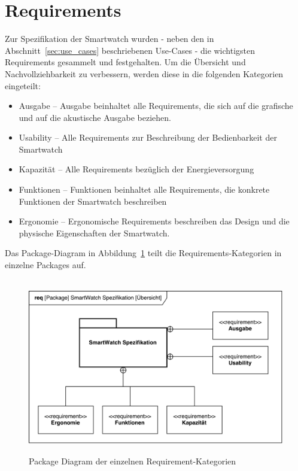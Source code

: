 \section{Requirements}
\label{sec:requirements}
Zur \gls{Spezifikation} der Smartwatch wurden - neben den in Abschnitt~\ref{sec:use_cases} beschriebenen \glspl{Use-Case} - die wichtigsten \glspl{Requirement} gesammelt und festgehalten. Um die Übersicht und Nachvollziehbarkeit zu verbessern, werden diese in die folgenden Kategorien eingeteilt:

\begin{itemize}
	\item Ausgabe -- Ausgabe beinhaltet alle Requirements, die sich auf die grafische und auf die akustische Ausgabe beziehen.
	\item \gls{Usability} -- Alle Requirements zur Beschreibung der Bedienbarkeit der Smartwatch
	\item Kapazität -- Alle Requirements bezüglich der Energieversorgung
	\item Funktionen -- Funktionen beinhaltet alle \glspl{Requirement}, die konkrete Funktionen der Smartwatch beschreiben
	\item \gls{Ergonomie} -- Ergonomische \glspl{Requirement} beschreiben das Design und die physische Eigenschaften der Smartwatch.
\end{itemize}

Das Package-Diagram in Abbildung~\ref{fig:package_diagram_requirements} teilt die \glspl{Requirement}-Kategorien in einzelne \glspl{Package} auf.

\begin{figure}
\centering\
\includegraphics[width=14cm]{img/package_diagram_smartWatch_requirements}
\caption[Requirements: Package Diagram]{Package Diagram der einzelnen Requirement-Kategorien}
\label{fig:package_diagram_requirements}
\end{figure}

